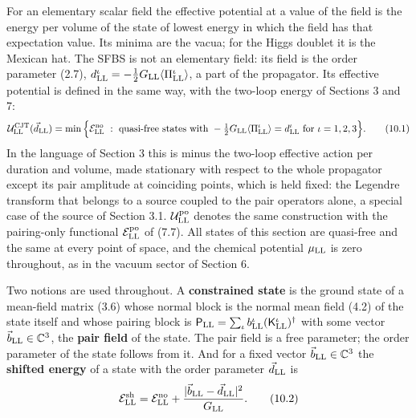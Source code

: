 \documentclass[
  10pt,
]{article}
\begin{document}
For an elementary scalar field the effective potential at a value of the
field is the energy per volume of the state of lowest energy in which
the field has that expectation value. Its minima are the vacua; for the
Higgs doublet it is the Mexican hat. The SFBS is not an elementary
field: its field is the order parameter (2.7),
\(d^\iota_{\rm LL}=-\tfrac12G_{\rm LL}\langle\Pi^\iota_{\rm LL}\rangle\),
a part of the propagator. Its effective potential is defined in the same
way, with the two-loop energy of Sections 3 and 7:
\[\mathcal U^{\rm CJT}_{\rm LL}(\vec d_{\rm LL})=\min\Big\{\mathcal E^{\rm no}_{\rm LL}\ :\ \text{quasi-free states with }-\tfrac12G_{\rm LL}\langle\Pi^\iota_{\rm LL}\rangle=d^\iota_{\rm LL}\ \text{for }\iota=1,2,3\Big\}.\tag{10.1}\]
In the language of Section 3 this is minus the two-loop effective action
per duration and volume, made stationary with respect to the whole
propagator except its pair amplitude at coinciding points, which is held
fixed: the Legendre transform that belongs to a source coupled to the
pair operators alone, a special case of the source of Section 3.1.
\(\mathcal U^{\rm po}_{\rm LL}\) denotes the same construction with the
pairing-only functional \(\mathcal E^{\rm po}_{\rm LL}\) of (7.7). All
states of this section are quasi-free and the same at every point of
space, and the chemical potential \(\mu_{\rm LL}\) is zero throughout,
as in the vacuum sector of Section 6.

Two notions are used throughout. A \textbf{constrained state} is the
ground state of a mean-field matrix (3.6) whose normal block is the
normal mean field (4.2) of the state itself and whose pairing block is
\(\mathsf P_{\rm LL}=\sum_\iota b^\iota_{\rm LL}(\mathsf K^\iota_{\rm LL})^\dagger\)
with some vector \(\vec b_{\rm LL}\in\mathbb C^3\), the \textbf{pair
field} of the state. The pair field is a free parameter; the order
parameter of the state follows from it. And for a fixed vector
\(\vec b_{\rm LL}\in\mathbb C^3\) the \textbf{shifted energy} of a state
with the order parameter \(\vec d_{\rm LL}\) is
\[\mathcal E^{\rm sh}_{\rm LL}=\mathcal E^{\rm no}_{\rm LL}+\frac{\lvert\vec b_{\rm LL}-\vec d_{\rm LL}\rvert^2}{G_{\rm LL}}.\tag{10.2}\]
\end{document}

